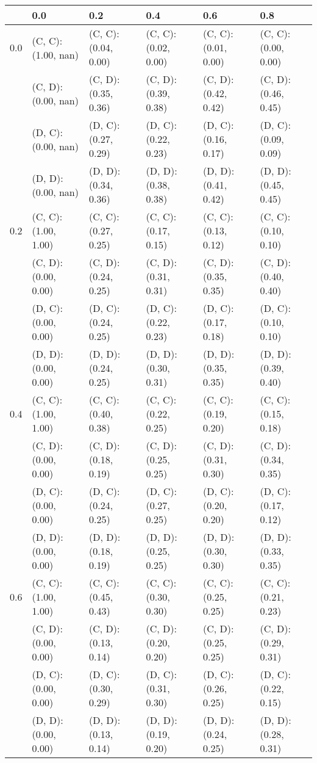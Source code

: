 \begin{tabular}{ l | l l l l l }
& 0.0 & 0.2 & 0.4 & 0.6 & 0.8 \\ 
\hline 
0.0 & (C, C): (1.00, nan) & (C, C): (0.04, 0.00) & (C, C): (0.02, 0.00) & (C, C): (0.01, 0.00) & (C, C): (0.00, 0.00) \\ 
 & (C, D): (0.00, nan) & (C, D): (0.35, 0.36) & (C, D): (0.39, 0.38) & (C, D): (0.42, 0.42) & (C, D): (0.46, 0.45) \\ 
 & (D, C): (0.00, nan) & (D, C): (0.27, 0.29) & (D, C): (0.22, 0.23) & (D, C): (0.16, 0.17) & (D, C): (0.09, 0.09) \\ 
 & (D, D): (0.00, nan) & (D, D): (0.34, 0.36) & (D, D): (0.38, 0.38) & (D, D): (0.41, 0.42) & (D, D): (0.45, 0.45) \\ 
\hline 
0.2 & (C, C): (1.00, 1.00) & (C, C): (0.27, 0.25) & (C, C): (0.17, 0.15) & (C, C): (0.13, 0.12) & (C, C): (0.10, 0.10) \\ 
 & (C, D): (0.00, 0.00) & (C, D): (0.24, 0.25) & (C, D): (0.31, 0.31) & (C, D): (0.35, 0.35) & (C, D): (0.40, 0.40) \\ 
 & (D, C): (0.00, 0.00) & (D, C): (0.24, 0.25) & (D, C): (0.22, 0.23) & (D, C): (0.17, 0.18) & (D, C): (0.10, 0.10) \\ 
 & (D, D): (0.00, 0.00) & (D, D): (0.24, 0.25) & (D, D): (0.30, 0.31) & (D, D): (0.35, 0.35) & (D, D): (0.39, 0.40) \\ 
\hline 
0.4 & (C, C): (1.00, 1.00) & (C, C): (0.40, 0.38) & (C, C): (0.22, 0.25) & (C, C): (0.19, 0.20) & (C, C): (0.15, 0.18) \\ 
 & (C, D): (0.00, 0.00) & (C, D): (0.18, 0.19) & (C, D): (0.25, 0.25) & (C, D): (0.31, 0.30) & (C, D): (0.34, 0.35) \\ 
 & (D, C): (0.00, 0.00) & (D, C): (0.24, 0.25) & (D, C): (0.27, 0.25) & (D, C): (0.20, 0.20) & (D, C): (0.17, 0.12) \\ 
 & (D, D): (0.00, 0.00) & (D, D): (0.18, 0.19) & (D, D): (0.25, 0.25) & (D, D): (0.30, 0.30) & (D, D): (0.33, 0.35) \\ 
\hline 
0.6 & (C, C): (1.00, 1.00) & (C, C): (0.45, 0.43) & (C, C): (0.30, 0.30) & (C, C): (0.25, 0.25) & (C, C): (0.21, 0.23) \\ 
 & (C, D): (0.00, 0.00) & (C, D): (0.13, 0.14) & (C, D): (0.20, 0.20) & (C, D): (0.25, 0.25) & (C, D): (0.29, 0.31) \\ 
 & (D, C): (0.00, 0.00) & (D, C): (0.30, 0.29) & (D, C): (0.31, 0.30) & (D, C): (0.26, 0.25) & (D, C): (0.22, 0.15) \\ 
 & (D, D): (0.00, 0.00) & (D, D): (0.13, 0.14) & (D, D): (0.19, 0.20) & (D, D): (0.24, 0.25) & (D, D): (0.28, 0.31) \\ 

\end{tabular}
